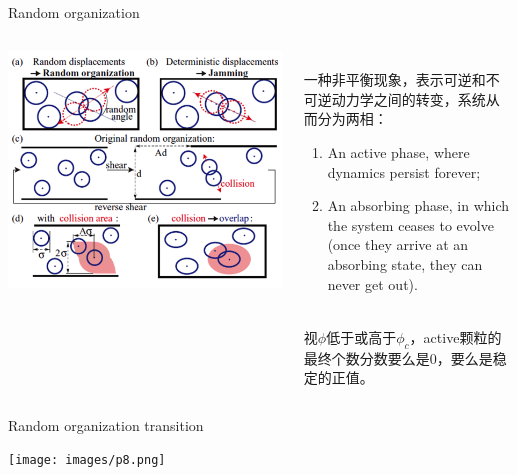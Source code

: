 \documentclass{bredelebeamer}
\begin{document}
\begin{frame}{Random organization}
\begin{columns}
\begin{column}{0.5\textwidth}
\centerline{\includegraphics[scale=0.2]{images/p7.png}}
\end{column}

\begin{column}{0.5\textwidth}
\
\newline\\
\setlength{\parindent}{2em}一种非平衡现象，表示可逆和不可逆动力学之间的转变，系统从而分为两相：
\begin{enumerate}[]
\item An active phase, where dynamics persist forever;\\
\item An absorbing phase, in which the system ceases to evolve (once they arrive at an
absorbing state, they can never get out).\\
\end{enumerate}
\
\newline\\
视$\phi$低于或高于$\phi_c$，active颗粒的最终个数分数要么是0，要么是稳定的正值。
\end{column}
\end{columns}
\end{frame}

\begin{frame}{Random organization transition}
\centerline{\texttt{[image: images/p8.png]}}
\end{frame}
\end{document}
